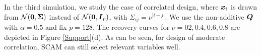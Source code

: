 In the third simulation, we study the case of correlated design, where
$\boldsymbol{x}_{i}$ is drawn from $\mathcal{N}(\boldsymbol{0},\boldsymbol{\Sigma})$
instead of $\mathcal{N}(\boldsymbol{0},\boldsymbol{I}_{p})$, with
$\Sigma_{ij}=\nu^{|i-j|}$. We use the non-additive $\boldsymbol{Q}$ with
$\alpha=0.5$ and fix $p=128$.  The recovery curves for $\nu=02, 0.4,
0.6, 0.8$ are depicted in Figure \ref{Support}(d). As can be seen, for
design of moderate correlation, SCAM can still select relevant
variables well.





